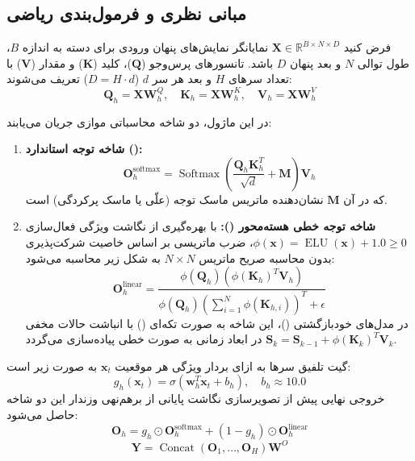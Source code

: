 \subsection{مبانی نظری و فرمول‌بندی ریاضی}
فرض کنید $\mathbf{X} \in \mathbb{R}^{B \times N \times D}$ نمایانگر نمایش‌های پنهان ورودی برای دسته به اندازه $B$، طول توالی $N$ و بعد پنهان $D$ باشد. تانسورهای پرس‌وجو ($\mathbf{Q}$)، کلید ($\mathbf{K}$) و مقدار ($\mathbf{V}$) با تعداد سرهای $H$ و بعد هر سر $d$ ($D = H \cdot d$) تعریف می‌شوند:
\begin{equation}
\mathbf{Q}_h = \mathbf{X} \mathbf{W}_h^Q, \quad \mathbf{K}_h = \mathbf{X} \mathbf{W}_h^K, \quad \mathbf{V}_h = \mathbf{X} \mathbf{W}_h^V
\end{equation}

در این ماژول، دو شاخه محاسباتی موازی جریان می‌یابند:
\begin{enumerate}
    \item \textbf{شاخه توجه استاندارد ():}
    \begin{equation}
    \mathbf{O}_h^{\text{softmax}} = \operatorname{Softmax}\left(\frac{\mathbf{Q}_h \mathbf{K}_h^T}{\sqrt{d}} + \mathbf{M}\right) \mathbf{V}_h
    \end{equation}
    که در آن $\mathbf{M}$ نشان‌دهنده ماتریس ماسک توجه (علّی یا ماسک پرکردگی) است.
    
    \item \textbf{شاخه توجه خطی هسته‌محور ():}
    با بهره‌گیری از نگاشت ویژگی فعال‌سازی $\phi(\mathbf{x}) = \operatorname{ELU}(\mathbf{x}) + 1.0 \ge 0$، ضرب ماتریسی بر اساس خاصیت شرکت‌پذیری بدون محاسبه صریح ماتریس $N \times N$ به شکل زیر محاسبه می‌شود:
    \begin{equation}
    \mathbf{O}_h^{\text{linear}} = \frac{\phi(\mathbf{Q}_h) \left( \phi(\mathbf{K}_h)^T \mathbf{V}_h \right)}{\phi(\mathbf{Q}_h) \left( \sum_{i=1}^N \phi(\mathbf{K}_{h, i}) \right)^T + \epsilon}
    \end{equation}
    در مدل‌های خودبازگشتی ()، این شاخه به صورت تکه‌ای () با انباشت حالات مخفی $\mathbf{S}_k = \mathbf{S}_{k-1} + \phi(\mathbf{K}_k)^T \mathbf{V}_k$ در ابعاد زمانی به صورت خطی پیاده‌سازی می‌گردد.
\end{enumerate}

گیت تلفیق سرها به ازای بردار ویژگی هر موقعیت $\mathbf{x}_t$ به صورت زیر است:
\begin{equation}
g_h(\mathbf{x}_t) = \sigma\left(\mathbf{w}_h^T \mathbf{x}_t + b_h\right), \quad b_h \approx 10.0
\end{equation}
خروجی نهایی پیش از تصویرسازی نگاشت پایانی از برهم‌نهی وزندار این دو شاخه حاصل می‌شود:
\begin{equation}
\mathbf{O}_h = g_h \odot \mathbf{O}_h^{\text{softmax}} + (1 - g_h) \odot \mathbf{O}_h^{\text{linear}}
\end{equation}
\begin{equation}
\mathbf{Y} = \operatorname{Concat}(\mathbf{O}_1, \dots, \mathbf{O}_H) \mathbf{W}^O
\end{equation}

